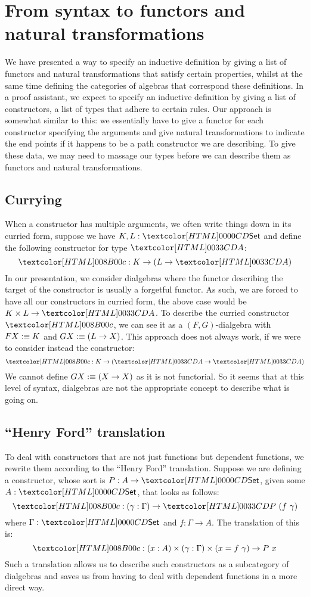 \section{From syntax to functors and natural transformations}
\label{from-syntax-to-functors}

We have presented a way to specify an inductive definition by giving a
list of functors and natural transformations that satisfy certain
properties, whilst at the same time defining the categories of
algebras that correspond these definitions. In a proof assistant, we
expect to specify an inductive definition by giving a list of
constructors, \ie a list of types that adhere to certain rules. Our
approach is somewhat similar to this: we essentially have to give a
functor for each constructor specifying the arguments and give natural
transformations to indicate the end points if it happens to be a path
constructor we are describing. To give these data, we may need to
massage our types before we can describe them as functors and natural
transformations.

\subsection{Currying}

When a constructor has multiple arguments, we often write things down
in its curried form, \eg suppose we have $K, L : \Set$ and define the
following constructor for type $\Aty$:
$$
\Ac : K \to (L \to \Aty)
$$
In our presentation, we consider dialgebras where the functor
describing the target of the constructor is usually a forgetful
functor. As such, we are forced to have all our constructors in
curried form, \eg the above case would be $K \times L \to \Aty$. To
describe the curried constructor $\Ac$, we can see it as a
$(F,G)$-dialgebra with $F X :\equiv K$ and $G X :\equiv (L \to X)$.
This approach does not always work, if we were to consider instead the
constructor:
$$
\Ac : K \to (\Aty \to \Aty)
$$
We cannot define $G X :\equiv (X \to X)$ as it is not functorial. So
it seems that at this level of syntax, dialgebras are not the
appropriate concept to describe what is going on.

\subsection{``Henry Ford'' translation}

To deal with constructors that are not just functions but dependent
functions, we rewrite them according to the ``Henry Ford''
translation. Suppose we are defining a constructor, whose sort is
$P : A \to \Set$, given some $A : \Set$, that looks as follows:
$$
\Pc : (\gamma : \Gamma) \to \Pty\ (f\ \gamma)
$$
where $\Gamma : \Set$ and $f : \Gamma \to A$. The translation of this
is:
$$
\Pc : (x : A) \times (\gamma : \Gamma) \times (x = f\ \gamma) \to P\ x
$$
Such a translation allows us to describe such constructors as a
subcategory of dialgebras and saves us from having to deal with
dependent functions in a more direct way. 

